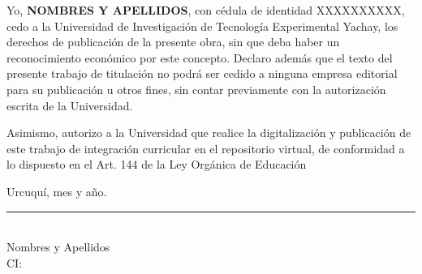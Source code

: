 Yo, \textbf{NOMBRES Y APELLIDOS}, con cédula de identidad XXXXXXXXXX, cedo a la Universidad de Investigación de Tecnología Experimental Yachay, los derechos de publicación de la presente obra, sin que deba haber un reconocimiento económico por este concepto. Declaro además que el texto del presente trabajo de titulación no podrá ser cedido a ninguna empresa editorial para su publicación u otros fines, sin contar previamente con la autorización escrita de la Universidad.

\vspace{0.6cm}

\noindent Asimismo, autorizo a la Universidad que realice la digitalización y publicación de este trabajo de integración curricular en el repositorio virtual, de conformidad a lo dispuesto en el Art. 144 de la Ley Orgánica de Educación 

\vspace{0.6cm}

\noindent Urcuquí, mes y año.

\vspace{2.5cm}

\begin{center}
    \rule[0mm]{60mm}{0.1mm} \\
    {Nombres y Apellidos}\\
    CI:
\end{center}

\thispagestyle{empty} %